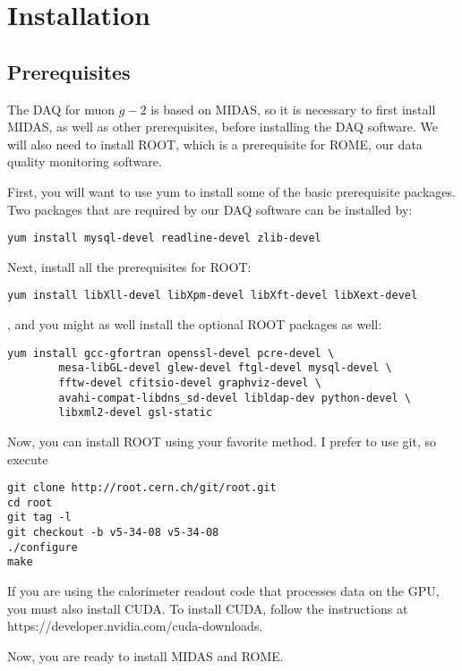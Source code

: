 \section{Installation}

\subsection{Prerequisites}
The DAQ for muon $g-2$ is based on MIDAS, so it is necessary to first install MIDAS, as well as other prerequisites, before installing the DAQ software. We will also need to install ROOT, which is a prerequisite for ROME, our data quality monitoring software.

First, you will want to use yum to install some of the basic prerequisite packages. Two packages that are required by our DAQ software can be installed by:

\begin{verbatim}
yum install mysql-devel readline-devel zlib-devel
\end{verbatim}

Next, install all the prerequisites for ROOT:

\begin{verbatim}
yum install libXll-devel libXpm-devel libXft-devel libXext-devel
\end{verbatim}

, and you might as well install the optional ROOT packages as well:

\begin{verbatim}
yum install gcc-gfortran openssl-devel pcre-devel \
        mesa-libGL-devel glew-devel ftgl-devel mysql-devel \
        fftw-devel cfitsio-devel graphviz-devel \
        avahi-compat-libdns_sd-devel libldap-dev python-devel \
        libxml2-devel gsl-static
\end{verbatim}

Now, you can install ROOT using your favorite method. I prefer to use git, so execute

\begin{verbatim}
git clone http://root.cern.ch/git/root.git
cd root
git tag -l
git checkout -b v5-34-08 v5-34-08
./configure
make
\end{verbatim}

If you are using the calorimeter readout code that processes data on the GPU, you must also install CUDA. To install CUDA, follow the instructions at https://developer.nvidia.com/cuda-downloads.

Now, you are ready to install MIDAS and ROME.


